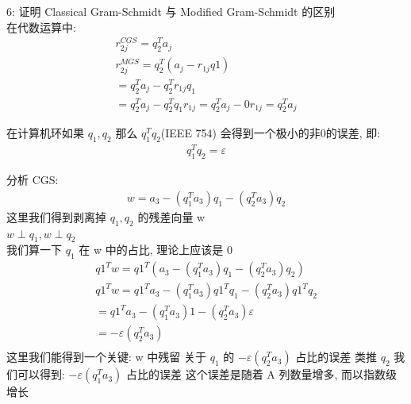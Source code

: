 \documentclass[12pt]{article}
\begin{document}
\begin{flushleft}
    6: 证明 Classical Gram-Schmidt 与 Modified Gram-Schmidt 的区别 \\
    在代数运算中: \\
    \begin{align}
        r_{2j}^{CGS} = q_{2}^{T}a_{j}             \\
        r_{2j}^{MGS} = q_{2}^{T}(a_{j}- r_{1j}q1) \\
        = q_{2}^{T}a_{j} - q_{2}^{T}r_{1j}q_{1}   \\
        = q_{2}^{T}a_{j} -  q_{2}^{T}q_{1}r_{1j}
        = q_{2}^{T}a_{j} - 0r_{1j}
        = q_{2}^{T}a_{j}
    \end{align}

    在计算机环如果 $q_{1}, q_{2}$ 那么 $q_{1}^{T}q_{2}$(IEEE 754) 会得到一个极小的非0的误差, 即: \\
    \begin{align}
        q_{1}^{T}q_{2} = \varepsilon
    \end{align}

    分析 CGS: \\
    \begin{align}
        w = a_{3} - (q_{1}^{T}a_{3})q_{1} - (q_{2}^{T}a_{3})q_{2}
    \end{align}
    这里我们得到剥离掉 $q_{1}, q_{2}$ 的残差向量 w \\
    $w \perp q_{1}, w \perp q_{2}$ \\
    我们算一下 $q_{1}$ 在 w 中的占比, 理论上应该是 0
    \begin{align}
        q1^{T}w = q1^{T}(a_{3} - (q_{1}^{T}a_{3})q_{1} - (q_{2}^{T}a_{3})q_{2})           \\
        q1^{T}w = q1^{T}a_{3} - (q_{1}^{T}a_{3})q1^{T}q_{1} - (q_{2}^{T}a_{3})q1^{T}q_{2} \\
        = q1^{T}a_{3} -  (q_{1}^{T}a_{3})1 - (q_{2}^{T}a_{3})\varepsilon                  \\
        = -\varepsilon(q_{2}^{T}a_{3})                                                    \\
    \end{align}
    这里我们能得到一个关键: w 中残留 关于 $q_{1}$ 的 $-\varepsilon(q_{2}^{T}a_{3})$ 占比的误差
    类推 $q_{2}$ 我们可以得到: $-\varepsilon(q_{1}^{T}a_{3})$ 占比的误差
    这个误差是随着 A 列数量增多, 而以指数级增长 \\


\end{flushleft}
\end{document}
